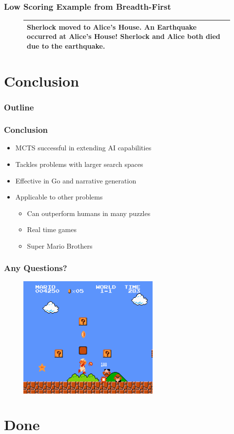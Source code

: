 \documentclass{beamer}
\begin{document}
\begin{frame}[fragile]
\frametitle{Low Scoring Example from Breadth-First}
\begin{figure}[h]
\begin{tabular}{|p{10cm}|}
\hline
Sherlock moved to Alice's House. An Earthquake occurred at Alice's House! Sherlock and Alice both died due to the earthquake. \\ \hline
\end{tabular}
\centering
\label{fig:BadStory}
\end{figure}
\end{frame}

\section{Conclusion}

\begin{frame}
\frametitle{Outline}
\tableofcontents[currentsection]
\end{frame}

\begin{frame}
\frametitle{Conclusion}
\begin{itemize}
	\item MCTS successful in extending AI capabilities
	\item Tackles problems with larger search spaces
	\item Effective in Go and narrative generation
	\item Applicable to other problems
	\begin{itemize}
		\item Can outperform humans in many puzzles
		\item Real time games
		\item Super Mario Brothers
	\end{itemize}
\end{itemize}
\end{frame}

\begin{frame}[fragile]
\frametitle{Any Questions?}
\begin{figure}[h]
	\includegraphics[width=7cm]{Diagrams/NESSuperMarioBros.png}
	\centering
\end{figure}
\end{frame}

\section{Done}
 
\end{document}
